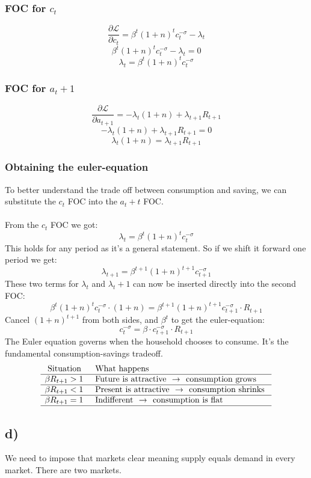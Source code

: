 \documentclass[12pt]{article}
\begin{document}
\subsubsection{FOC for $c_t$}
$$
\frac{\partial \mathcal{L}}{\partial c_t}=\beta^t(1+n)^t c_t^{-\sigma}-\lambda_t
$$
$$
\beta^t(1+n)^t c_t^{-\sigma}-\lambda_t=0
$$
$$
\boxed{\lambda_t=\beta^t(1+n)^t c_t^{-\sigma}}
$$

\subsubsection{FOC for $a_t+1$}
$$
\frac{\partial \mathcal{L}}{\partial a_{t+1}}=-\lambda_t(1+n)+\lambda_{t+1} R_{t+1}
$$
$$
-\lambda_t(1+n)+\lambda_{t+1} R_{t+1}=0
$$
$$
\boxed{\lambda_t(1+n)=\lambda_{t+1} R_{t+1}}
$$

\subsubsection{Obtaining the euler-equation}
To better understand the trade off between consumption and saving, we can substitute the $c_t$ FOC into the $a_t+t$ FOC.
\\
\\
From the $c_t$ FOC we got:
$$
\lambda_t=\beta^t(1+n)^t c_t^{-\sigma}
$$
This holds for any period as it’s a general statement. So if we shift it forward one period we get:
$$
\lambda_{t+1}=\beta^{t+1}(1+n)^{t+1} c_{t+1}^{-\sigma}
$$
These two terms for $\lambda_t$ and $\lambda_t+1$ can now be inserted directly into the second FOC:
$$
\beta^t(1+n)^t c_t^{-\sigma} \cdot(1+n)=\beta^{t+1}(1+n)^{t+1} c_{t+1}^{-\sigma} \cdot R_{t+1}
$$
Cancel $(1+n)^{t+1}$ from both sides, and $\beta^t$ to get the euler-equation:
$$
\boxed{c_t^{-\sigma}=\beta \cdot c_{t+1}^{-\sigma} \cdot R_{t+1}}
$$
The Euler equation governs when the household chooses to consume. It's the fundamental consumption-savings tradeoff.
$$
\begin{array}{ll}
\text { Situation } & \text { What happens } \\
\hline \beta R_{t+1}>1 & \text { Future is attractive } \text { → } \text { consumption grows } \\
\hline \beta R_{t+1}<1 & \text { Present is attractive } \text { → } \text { consumption shrinks } \\
\hline \beta R_{t+1}=1 & \text { Indifferent } \text { → } \text { consumption is flat } \\
\hline
\end{array}
$$
\subsection{d)}
We need to impose that markets clear meaning supply equals demand in every market. There are two markets.
\end{document}
